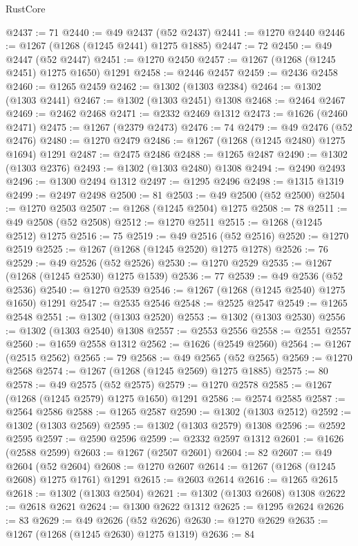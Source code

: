 \begin{lexlean}{RustCore}
\begin{coremodule}
@2437 := 71
@2440 := @49 @2437 (@52 @2437)
@2441 := @1270 @2440
@2446 := @1267 (@1268 (@1245 @2441) @1275 @1885)
@2447 := 72
@2450 := @49 @2447 (@52 @2447)
@2451 := @1270 @2450
@2457 := @1267 (@1268 (@1245 @2451) @1275 @1650) @1291
@2458 := @2446 @2457
@2459 := @2436 @2458
@2460 := @1265 @2459
@2462 := @1302 (@1303 @2384)
@2464 := @1302 (@1303 @2441)
@2467 := @1302 (@1303 @2451) @1308
@2468 := @2464 @2467
@2469 := @2462 @2468
@2471 := @2332 @2469 @1312
@2473 := @1626 (@2460 @2471)
@2475 := @1267 (@2379 @2473)
@2476 := 74
@2479 := @49 @2476 (@52 @2476)
@2480 := @1270 @2479
@2486 := @1267 (@1268 (@1245 @2480) @1275 @1694) @1291
@2487 := @2475 @2486
@2488 := @1265 @2487
@2490 := @1302 (@1303 @2376)
@2493 := @1302 (@1303 @2480) @1308
@2494 := @2490 @2493
@2496 := @1300 @2494 @1312
@2497 := @1295 @2496
@2498 := @1315 @1319
@2499 := @2497 @2498
@2500 := 81
@2503 := @49 @2500 (@52 @2500)
@2504 := @1270 @2503
@2507 := @1268 (@1245 @2504) @1275
@2508 := 78
@2511 := @49 @2508 (@52 @2508)
@2512 := @1270 @2511
@2515 := @1268 (@1245 @2512) @1275
@2516 := 75
@2519 := @49 @2516 (@52 @2516)
@2520 := @1270 @2519
@2525 := @1267 (@1268 (@1245 @2520) @1275 @1278)
@2526 := 76
@2529 := @49 @2526 (@52 @2526)
@2530 := @1270 @2529
@2535 := @1267 (@1268 (@1245 @2530) @1275 @1539)
@2536 := 77
@2539 := @49 @2536 (@52 @2536)
@2540 := @1270 @2539
@2546 := @1267 (@1268 (@1245 @2540) @1275 @1650) @1291
@2547 := @2535 @2546
@2548 := @2525 @2547
@2549 := @1265 @2548
@2551 := @1302 (@1303 @2520)
@2553 := @1302 (@1303 @2530)
@2556 := @1302 (@1303 @2540) @1308
@2557 := @2553 @2556
@2558 := @2551 @2557
@2560 := @1659 @2558 @1312
@2562 := @1626 (@2549 @2560)
@2564 := @1267 (@2515 @2562)
@2565 := 79
@2568 := @49 @2565 (@52 @2565)
@2569 := @1270 @2568
@2574 := @1267 (@1268 (@1245 @2569) @1275 @1885)
@2575 := 80
@2578 := @49 @2575 (@52 @2575)
@2579 := @1270 @2578
@2585 := @1267 (@1268 (@1245 @2579) @1275 @1650) @1291
@2586 := @2574 @2585
@2587 := @2564 @2586
@2588 := @1265 @2587
@2590 := @1302 (@1303 @2512)
@2592 := @1302 (@1303 @2569)
@2595 := @1302 (@1303 @2579) @1308
@2596 := @2592 @2595
@2597 := @2590 @2596
@2599 := @2332 @2597 @1312
@2601 := @1626 (@2588 @2599)
@2603 := @1267 (@2507 @2601)
@2604 := 82
@2607 := @49 @2604 (@52 @2604)
@2608 := @1270 @2607
@2614 := @1267 (@1268 (@1245 @2608) @1275 @1761) @1291
@2615 := @2603 @2614
@2616 := @1265 @2615
@2618 := @1302 (@1303 @2504)
@2621 := @1302 (@1303 @2608) @1308
@2622 := @2618 @2621
@2624 := @1300 @2622 @1312
@2625 := @1295 @2624
@2626 := 83
@2629 := @49 @2626 (@52 @2626)
@2630 := @1270 @2629
@2635 := @1267 (@1268 (@1245 @2630) @1275 @1319)
@2636 := 84

\end{coremodule}
\end{lexlean}
